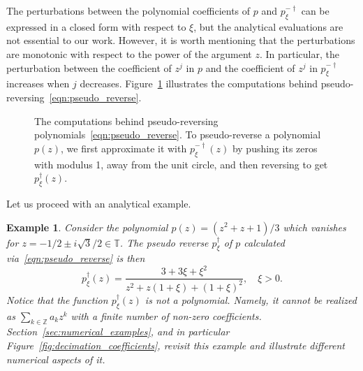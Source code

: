 \documentclass[12pt]{article}
\newtheorem{example}{Example}[section]
\begin{document}
The perturbations between the polynomial coefficients of $p$ and $p_\xi^{-\dagger}$ can be expressed in a closed form with respect to $\xi$, but the analytical evaluations are not essential to our work. However, it is worth mentioning that the perturbations are monotonic with respect to the power of the argument $z$. In particular, the perturbation between the coefficient of $z^j$ in $p$ and the coefficient of $z^j$ in $p_\xi^{-\dagger}$ increases when $j$ decreases. Figure~\ref{diag:pseudo_reversing} illustrates the computations behind pseudo-reversing~\eqref{eqn:pseudo_reverse}.

\begin{figure}[H]
\centering
 \caption{The computations behind pseudo-reversing polynomials~\eqref{eqn:pseudo_reverse}. To pseudo-reverse a polynomial $p(z)$, we first approximate it with $p_\xi^{-\dagger}(z)$ by pushing its zeros with modulus 1, away from the unit circle, and then reversing to get $p_\xi^{\dagger}(z)$.}
 \label{diag:pseudo_reversing}
\end{figure}

Let us proceed with an analytical example.


\begin{example}\label{example_2}
    Consider the polynomial $p(z)=(z^2+z+1)/3$ which vanishes for $z=-1/2\pm i\sqrt{3}/2\in\mathbb{T}$. The pseudo reverse $p_\xi^\dagger$ of $p$ calculated via~\eqref{eqn:pseudo_reverse} is then
    \begin{equation*}
        p_\xi^\dagger(z)=\frac{3+3\xi+\xi^2}{z^2 + z(1+\xi)+ (1+\xi)^2}, \quad \xi>0.
    \end{equation*}
    Notice that the function $p_\xi^\dagger(z)$ is not a polynomial. Namely, it cannot be realized as $\sum_{k\in\mathbb{Z}}a_kz^k$ with a finite number of non-zero coefficients. Section~\ref{sec:numerical_examples}, and in particular Figure~\ref{fig:decimation_coefficients}, revisit this example and illustrate different numerical aspects of it.
\end{example}
\end{document}
